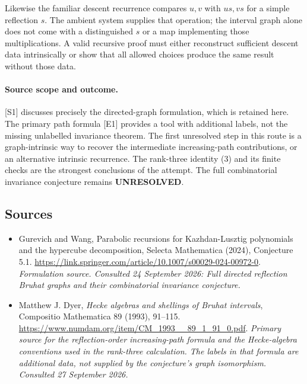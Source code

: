 \documentclass[11pt]{article}
\begin{document}
Likewise the familiar descent recurrence compares $u,v$ with $us,vs$
for a simple reflection $s$. The ambient system supplies that operation;
the interval graph alone does not come with a distinguished $s$ or a
map implementing those multiplications. A valid recursive proof must
either reconstruct sufficient descent data intrinsically or show that
all allowed choices produce the same result without those data.

\paragraph{Source scope and outcome.}
[S1] discusses precisely the directed-graph formulation, which is
retained here. The primary path formula [E1] provides a tool with
additional labels, not the missing unlabelled invariance theorem.
The first unresolved step in this route is a graph-intrinsic way to
recover the intermediate increasing-path contributions, or an
alternative intrinsic recurrence. The rank-three identity (3) and its
finite checks are the strongest conclusions of the attempt. The full
combinatorial invariance conjecture remains \textbf{UNRESOLVED}.

\subsection{Sources}
\begin{itemize}
\item[S1]Gurevich and Wang, Parabolic recursions for Kazhdan-Lusztig polynomials and the hypercube decomposition, Selecta Mathematica (2024), Conjecture 5.1.
\url{https://link.springer.com/article/10.1007/s00029-024-00972-0}.
\textit{Formulation source. Consulted 24 September 2026: Full directed reflection Bruhat graphs and their combinatorial invariance conjecture.}
\item[E1]Matthew J. Dyer, \emph{Hecke algebras and shellings of Bruhat
intervals}, Compositio Mathematica 89 (1993), 91--115.
\url{https://www.numdam.org/item/CM_1993__89_1_91_0.pdf}.
\textit{Primary source for the reflection-order increasing-path formula
and the Hecke-algebra conventions used in the rank-three calculation.
The labels in that formula are additional data, not supplied by the
conjecture's graph isomorphism. Consulted 27 September 2026.}

\end{itemize}
\end{document}
